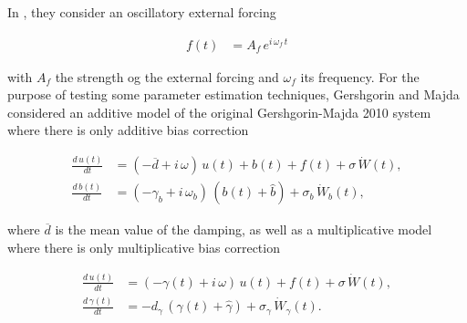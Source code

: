 In \cite{Gershgorin10}, they consider an oscillatory external forcing

\begin{align}
	f\left( t \right) &= A_{f}\,e^{i\,\omega_{f}\,t}
\end{align}

with $A_f$ the strength og the external forcing and $\omega_f$ its frequency. For the purpose of testing some parameter estimation techniques, Gershgorin and Majda considered an additive model of the original Gershgorin-Majda 2010 system where there is only additive bias correction

\begin{align}
	\frac{d\,u\left( t \right)}{dt} &= \left( -\overline{d} + i\,\omega \right)\,u\left( t \right) + b\left( t \right) + f\left( t \right) + \sigma\,\dot{W}\left( t \right), \\
	\frac{d\,b\left( t \right)}{dt} &= \left( -\gamma_{b} + i\,\omega_{b} \right)\,\left( b\left( t \right) + \widehat{b} \right) + \sigma_{b}\,\dot{W}_{b}\left( t \right),
\end{align}

where $\overline{d}$ is the mean value of the damping, as well as a multiplicative model where there is only multiplicative bias correction

\begin{align}
	\frac{d\,u\left( t \right)}{dt} &= \left( -\gamma\left( t \right) + i\,\omega \right)\,u\left( t \right) + f\left( t \right) + \sigma\,\dot{W}\left( t \right), \\
	\frac{d\,\gamma\left( t \right)}{dt} &= -d_{\gamma}\,\left( \gamma\left( t \right) + \widehat{\gamma} \right) + \sigma_{\gamma}\,\dot{W}_{\gamma}\left( t \right).
\end{align}
